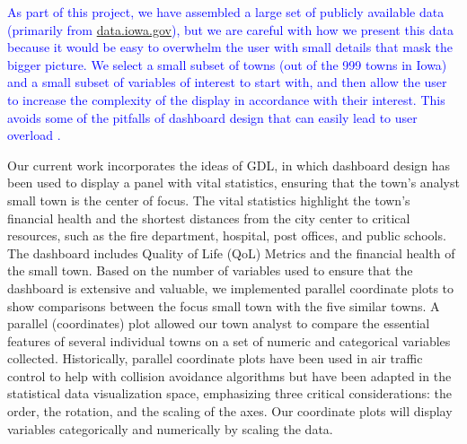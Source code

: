 \documentclass[10pt]{article}\usepackage[]{graphicx}\usepackage[]{color}
\newcommand{\svp}[1]{{\textcolor{blue}{#1}}}
\begin{document}
\svp{As part of this project, we have assembled a large set of publicly available data (primarily from \url{data.iowa.gov}), but we are careful with how we present this data because it would be easy to overwhelm the user with small details that mask the bigger picture. We select a small subset of towns (out of the 999 towns in Iowa) and a small subset of variables of interest to start with, and then allow the user to increase the complexity of the display in accordance with their interest. This avoids some of the pitfalls of dashboard design that can easily lead to user overload \cite{few}.}



Our current work incorporates the ideas of GDL, in which dashboard design has been used to display a panel with vital statistics, ensuring that the town's analyst small town is the center of focus. The vital statistics highlight the town's financial health and the shortest distances from the city center to critical resources, such as the fire department, hospital, post offices, and public schools. The dashboard includes Quality of Life (QoL) Metrics and the financial health of the small town. Based on the number of variables used to ensure that the dashboard is extensive and valuable, we implemented parallel coordinate plots to show comparisons between the focus small town with the five similar towns. A parallel (coordinates) plot allowed our town analyst to compare the essential features of several individual towns on a set of numeric and categorical variables collected. Historically, parallel coordinate plots have been used in air traffic control to help with collision avoidance algorithms but have been adapted in the statistical data visualization space, emphasizing three critical considerations: the order, the rotation, and the scaling of the axes. Our coordinate plots will display variables categorically and numerically by scaling the data.
\end{document}
